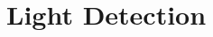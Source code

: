 \documentclass[a4paper, 11pt, twoside, openany]{ThesisStyle}
\begin{document}
\chapter{Light Detection}
\label{chLightDetection}
	
	
	
	
	
	
	
\end{document}
